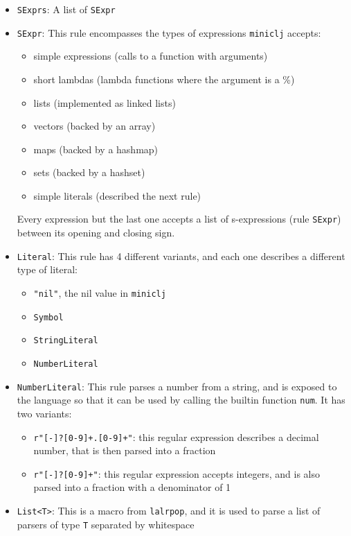 \documentclass[11pt]{scrreprt}
\begin{document}
\begin{itemize}
  \item \texttt{SExprs}: A list of \texttt{SExpr}
  \item \texttt{SExpr}: This rule encompasses the types of expressions \texttt{miniclj} accepts:
  \begin{itemize}
    \item simple expressions (calls to a function with arguments)
    \item short lambdas (lambda functions where the argument is a \%)
    \item lists (implemented as linked lists)
    \item vectors (backed by an array)
    \item maps (backed by a hashmap)
    \item sets (backed by a hashset)
    \item simple literals (described the next rule)
  \end{itemize}
  Every expression but the last one accepts a list of s-expressions (rule \texttt{SExpr}) between its opening and closing sign.
  \item \texttt{Literal}: This rule has 4 different variants, and each one describes a different type of literal:
  \begin{itemize}
    \item \texttt{"nil"}, the nil value in \texttt{miniclj}
    \item \texttt{Symbol}
    \item \texttt{StringLiteral}
    \item \texttt{NumberLiteral}
  \end{itemize}
  \item \texttt{NumberLiteral}: This rule parses a number from a string, and is exposed to the language so that it can be used by calling the builtin function \texttt{num}. It has two variants:
  \begin{itemize}
    \item \texttt{r"[-]?[0-9]+.[0-9]+"}: this regular expression describes a decimal number, that is then parsed into a fraction
    \item \texttt{r"[-]?[0-9]+"}: this regular expression accepts integers, and is also parsed into a fraction with a denominator of 1
  \end{itemize}
  \item \texttt{List<T>}: This is a macro from \texttt{lalrpop}, and it is used to parse a list of parsers of type \texttt{T} separated by whitespace

\end{itemize}
\end{document}
